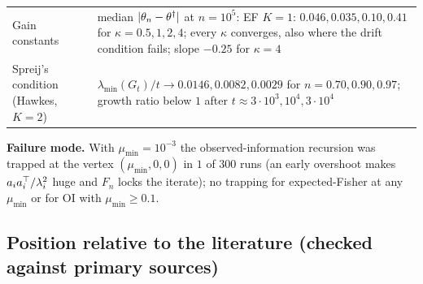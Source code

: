 \begin{center}
\begin{tabular}{@{}p{3.1cm}p{9.3cm}@{}}
Gain constants & median $\lvert \theta_n-\theta^\dagger\rvert$ at $n=10^5$: EF $K=1$: $0.046,0.035,0.10,0.41$ for $\kappa=0.5,1,2,4$; every $\kappa$ converges, also where the drift condition fails; slope $-0.25$ for $\kappa=4$\\
Spreij's condition (Hawkes, $K=2$) & $\lambda_{\min}(G_t)/t\to0.0146,0.0082,0.0029$ for $n=0.70,0.90,0.97$; growth ratio below $1$ after $t\approx3\cdot10^3,10^4,3\cdot10^4$\\\bottomrule
\end{tabular}
\end{center}
\noindent\textbf{Failure mode.} With $\mu_{\min}=10^{-3}$ the observed-information recursion was trapped at the vertex $(\mu_{\min},0,0)$ in $1$ of $300$ runs (an early overshoot makes $a_ia_i^{\top}/\lambda_i^2$ huge and $F_n$ locks the iterate); no trapping for expected-Fisher at any $\mu_{\min}$ or for OI with $\mu_{\min}\ge0.1$.

\subsection{Position relative to the literature (checked against primary sources)}\label{sec:mis-lit}

